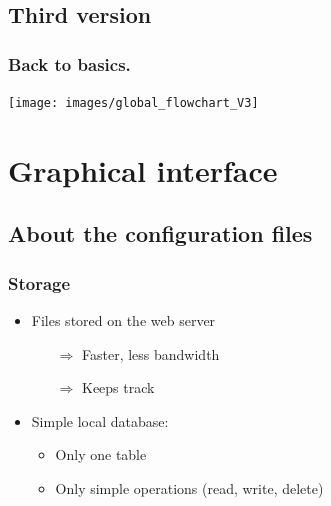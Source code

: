 \documentclass{beamer}
\begin{document}
\subsection{Third version}
\begin{frame}
\frametitle{Back to basics.}
\begin{center}
	\texttt{[image: images/global\_flowchart\_V3]}
\end{center}
\end{frame}


\section{Graphical interface}
\frame{\sectionpage}

\subsection{About the configuration files}
\begin{frame}
\frametitle{Storage}
\begin{itemize}
	\item Files stored on the web server
	\begin{itemize}
		\item[$\Rightarrow$] Faster, less bandwidth
		\item[$\Rightarrow$] Keeps track
	\end{itemize}
	\item Simple local database:
	\begin{itemize}
		\item Only one table
		\item Only simple operations (read, write, delete)
	\end{itemize}
\end{itemize}
\end{frame}
\end{document}
